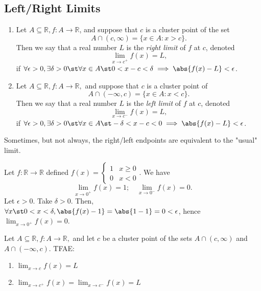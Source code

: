 \documentclass[12pt]{article}
\begin{document}
\subsection{Left/Right Limits}

\begin{definition}
  \begin{enumerate}
    \item Let $A\subseteq \mathbb{R}, f : A \to \mathbb{R}$, and suppose that $c$ is a cluster point of the set \[
      A \cap (c, \infty) = \{x \in A : x > c\}.
    \]
    Then we say that a real number $L$ is the \emph{right limit} of $f$ at $c$, denoted \[
    \lim_{x\to c^+} f(x)= L,
    \]
    if $\forall \epsilon > 0, \exists \delta > 0 \st \forall x \in A \st 0 < x - c < \delta \implies \abs{f(x) - L} < \epsilon$.
    \item Let $A \subseteq \mathbb{R}, f: A \to \mathbb{R},$ and suppose that $c$ is a cluster point of \[
    A \cap (- \infty, c) = \{x \in A : x < c\}.
    \]
    Then we say that a real number $L$ is the \emph{left limit} of $f$ at $c$, denoted \[
    \lim_{x \to c^-} f(x) = L,  
    \]
    if $\forall \epsilon > 0, \exists \delta > 0 \st \forall x \in A \st - \delta < x - c < 0 \implies \abs{f(x) - L} < \epsilon$.
  \end{enumerate}
\end{definition}

\begin{remark}
  Sometimes, but not always, the right/left endpoints are equivalent to the "usual" limit.
\end{remark}

\begin{example}
  Let $f: \mathbb{R} \to \mathbb{R}$ defined $f(x) = \begin{cases}
    1 & x \geq 0\\
    0 & x < 0
  \end{cases}$. We have \[\lim_{x\to 0^+} f(x) = 1; \quad \lim_{x\to 0^-} f(x) = 0.\]
  Let $\epsilon > 0$. Take $\delta > 0$. Then, $\forall x \st 0 < x < \delta, \abs{f(x) - 1} = \abs{1 - 1} =  0 < \epsilon$, hence $\lim_{x\to 0^+} f(x) = 0$. %

\end{example}

\begin{proposition}\label{prop:leftrightequiv}
  Let $A \subseteq \mathbb{R}, f : A \to \mathbb{R},$ and let $c$ be a cluster point of the sets $A \cap (c, \infty)$ and  $A \cap (-\infty, c)$. TFAE:
  \begin{enumerate}
    \item $\lim_{x\to c} f(x) = L$
    \item $\lim_{x\to c^+} f(x) = \lim_{x \to c^-} f(x) = L$
  \end{enumerate}
\end{proposition}
\end{document}
